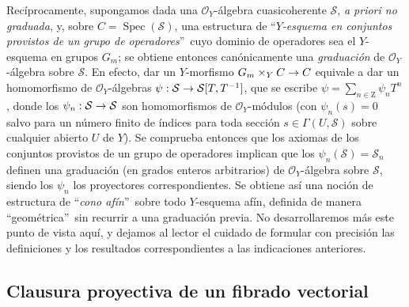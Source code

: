\documentclass[oneside,10pt]{amsart}
\makeatletter
\newcommand{\ega@arrow}[2]{\mathchoice{#1}{#2}{#2}{#2}}
\renewcommand{\to}{\ega@arrow{\longrightarrow}{\rightarrow}}
\newcommand{\oldpage}[2][]{\marginnote{\normalfont\footnotesize\textbf{#1}~|~#2}\ignorespaces}
\let\EGAOriginalLabel\label
\renewcommand{\label}[1]{\phantomsection\EGAOriginalLabel{#1}}
\makeatother
\begin{document}
\begin{remark}[8.3.9]
Recíprocamente, supongamos dada una $\mathcal{O}_Y$-álgebra cuasicoherente $\mathcal{S}$, \emph{a priori no graduada}, y, sobre $C=\operatorname{Spec}(\mathcal{S})$, una estructura de \textquotedblleft\emph{$Y$-esquema en conjuntos provistos de un grupo de operadores}\textquotedblright\ cuyo dominio de operadores sea el $Y$-esquema en grupos $G_m$;
se obtiene entonces canónicamente una \emph{graduación} de $\mathcal{O}_Y$-álgebra sobre $\mathcal{S}$.
En efecto, dar un $Y$-morfismo $G_m\times_YC\to C$ equivale a dar un homomorfismo de $\mathcal{O}_Y$-álgebras $\psi:\mathcal{S}\to\mathcal{S}[T,T^{-1}]$, que se escribe $\psi=\sum_{n\in\mathrm{Z}}\psi_nT^n$, donde los $\psi_n:\mathcal{S}\to\mathcal{S}$ son homomorfismos de $\mathcal{O}_Y$-módulos (con $\psi_n(s)=0$ salvo para un número finito de índices para toda sección $s\in\Gamma(U,\mathcal{S})$ sobre cualquier abierto $U$ de $Y$).
Se comprueba entonces que los axiomas de los conjuntos provistos de un grupo de operadores implican que los $\psi_n(\mathcal{S})=\mathcal{S}_n$ definen una graduación (en grados enteros arbitrarios) de $\mathcal{O}_Y$-álgebra sobre $\mathcal{S}$, siendo los $\psi_n$ los proyectores correspondientes.
Se obtiene así una noción de estructura de \textquotedblleft\emph{cono afín}\textquotedblright\ sobre todo $Y$-esquema afín, definida de manera \textquotedblleft geométrica\textquotedblright\ sin recurrir a una graduación previa.
\oldpage[II]{168}
No desarrollaremos más este punto de vista aquí, y dejamos al lector el cuidado de formular con precisión las definiciones y los resultados correspondientes a las indicaciones anteriores.
\end{remark}
\subsection{Clausura proyectiva de un fibrado vectorial}
\label{subsection:II.8.4-fr}
\end{document}
